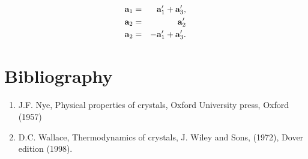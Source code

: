 \documentclass[12pt,a4paper]{article}
\begin{document}
\begin{eqnarray}
{\bf a}_1&=& {\bf a}_1' + {\bf a}_3', \\
{\bf a}_2&=& {\bf a}_2' \\
{\bf a}_2&=& -{\bf a}_1' + {\bf a}_3'.
\end{eqnarray}


\newpage

\section{\color{coral}Bibliography}
\begin{enumerate}

\item
J.F. Nye, Physical properties of crystals, Oxford University press, 
Oxford (1957)

\item
D.C. Wallace, Thermodynamics of crystals, J. Wiley and Sons, (1972),
Dover edition (1998).

\end{enumerate}
\end{document}
